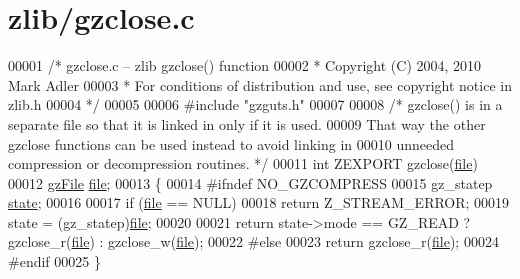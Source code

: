 \hypertarget{zlib_2gzclose_8c_source}{}\section{zlib/gzclose.c}
\label{zlib_2gzclose_8c_source}

\begin{DoxyCode}
00001 \textcolor{comment}{/* gzclose.c -- zlib gzclose() function}
00002 \textcolor{comment}{ * Copyright (C) 2004, 2010 Mark Adler}
00003 \textcolor{comment}{ * For conditions of distribution and use, see copyright notice in zlib.h}
00004 \textcolor{comment}{ */}
00005 
00006 \textcolor{preprocessor}{#include "gzguts.h"}
00007 
00008 \textcolor{comment}{/* gzclose() is in a separate file so that it is linked in only if it is used.}
00009 \textcolor{comment}{   That way the other gzclose functions can be used instead to avoid linking in}
00010 \textcolor{comment}{   unneeded compression or decompression routines. */}
00011 \textcolor{keywordtype}{int} ZEXPORT gzclose(\hyperlink{structfile}{file})
00012     \hyperlink{structgz_file__s}{gzFile} \hyperlink{structfile}{file};
00013 \{
00014 \textcolor{preprocessor}{#ifndef NO\_GZCOMPRESS}
00015     gz\_statep \hyperlink{structstate}{state};
00016 
00017     \textcolor{keywordflow}{if} (\hyperlink{structfile}{file} == NULL)
00018         \textcolor{keywordflow}{return} Z\_STREAM\_ERROR;
00019     state = (gz\_statep)\hyperlink{structfile}{file};
00020 
00021     \textcolor{keywordflow}{return} state->mode == GZ\_READ ? gzclose\_r(\hyperlink{structfile}{file}) : gzclose\_w(\hyperlink{structfile}{file});
00022 \textcolor{preprocessor}{#else}
00023     \textcolor{keywordflow}{return} gzclose\_r(\hyperlink{structfile}{file});
00024 \textcolor{preprocessor}{#endif}
00025 \}
\end{DoxyCode}

